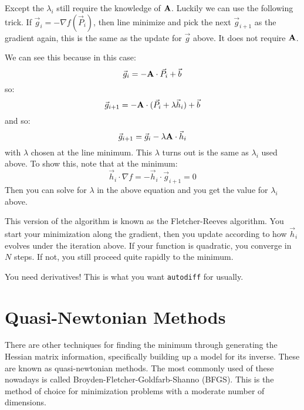 Except the $\lambda_i$ still require the knowledge of
${\bf A}$. Luckily we can use the following trick. If $\vec{g}_i = -
\nabla f(\vec{P}_i)$, then line minimize and pick the next
$\vec{g}_{i+1}$ as the gradient again, this is the same as the update
for $\vec{g}$ above. It does not require ${\bf A}$.

We can see this because in this case:
\begin{equation}
\vec{g}_i = - {\bf A}\cdot\vec{P}_i + \vec{b}
\end{equation}
so:
\begin{equation}
\vec{g}_{i+1} = - {\bf A}\cdot (\vec{P}_i + \lambda \vec{h}_i) + \vec{b}
\end{equation}
and so:
\begin{equation}
\vec{g}_{i+1} = \vec{g}_i - \lambda {\bf A}\cdot\vec{h}_i
\end{equation}
with $\lambda$ chosen at the line minimum. This $\lambda$ turns out is
the same as $\lambda_i$ used above. To show this, note that at the
minimum:
\begin{equation}
  \vec{h}_i\cdot \nabla f = -\vec{h}_i \cdot \vec{g}_{i+1}  = 0
\end{equation}
Then you can solve for $\lambda$ in the above equation and you get the
value for $\lambda_i$ above.

This version of the algorithm is known as the Fletcher-Reeves
algorithm. You start your minimization along the gradient, then you
update according to how $\vec{h}_i$ evolves under the iteration
above. If your function is quadratic, you converge in $N$ steps. If
not, you still proceed quite rapidly to the minimum.

You need derivatives! This is what you want {\tt autodiff} for
usually.

\section{Quasi-Newtonian Methods}

There are other techniques for finding the minimum through generating
the Hessian matrix information, specifically building up a model for
its inverse. These are known as quasi-newtonian methods. The most
commonly used of these nowadays is called
Broyden-Fletcher-Goldfarb-Shanno (BFGS).  This is the method of choice
for minimization problems with a moderate number of dimensions.

